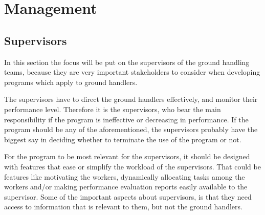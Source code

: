 \section{Management}
\subsection{Supervisors}
In this section the focus will be put on the supervisors of the ground handling teams, because they are very important stakeholders to consider when developing programs which apply to ground handlers.

The supervisors have to direct the ground handlers effectively, and monitor their performance level. Therefore it is the supervisors, who bear the main responsibility if the program is ineffective or decreasing in performance. If the program should be any of the aforementioned, the supervisors probably have the biggest say in deciding whether to terminate the use of the program or not.

For the program to be most relevant for the supervisors, it should be designed with features that ease or simplify the workload of the supervisors. That could be features like motivating the workers, dynamically allocating tasks among the workers and/or making performance evaluation reports easily available to the supervisor.
Some of the important aspects about supervisors, is that they need access to information that is relevant to them, but not the ground handlers.